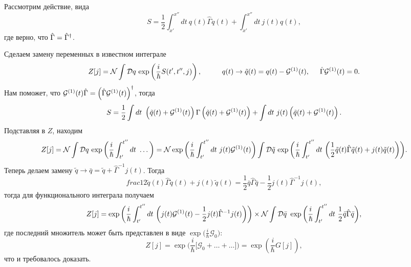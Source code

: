 
Рассмотрим действие, вида
\begin{equation*}
	S = \frac{1}{2} \int_{x'}^{x''} dt\ q(t) \hat{\Gamma} q(t) + 
	\int_{x'}^{x''}  dt\ j(t) q(t),
\end{equation*}
где верно, что $\hat{\Gamma} = \hat{\Gamma}^\dagger$. 


Сделаем замену переменных в известном интеграле
\begin{equation*}
	Z[j] = \n \int \Dq \exp\left(\frac{i}{\hbar} S(t', t'', j)\right),
	\hspace{10 mm} 
	q(t) \to \tilde{q}(t) = q(t) - \G (t),
	\hspace{5 mm} 
	\hat{\Gamma} \G (t) = 0.
\end{equation*}
Нам поможет, что $\mathcal{G}^{(1)}(t) \hat{\Gamma} = \left(\hat{\Gamma} \mathcal{G}^{(1)}(t)\right)^\dagger$, тогда
\begin{equation*}
	S = \frac{1}{2} \int dt\ \left(\tilde{q}(t) + \mathcal{G}^{(1)}(t)\right) \Gamma \left(\tilde{q}(t) + \mathcal{G}^{(1)} (t)\right) + \int dt\ j(t) \left(\tilde{q}(t) + \mathcal{G}^{(1)}(t)\right).
\end{equation*}
Подставляя в $Z$, находим
\begin{equation*}
	Z[j] = \mathcal{N} \int\mathcal{D}q\, \exp\bigg(
		\frac{i}{\hbar} \int_{t'}^{t''} dt\ \ldots
	\bigg) = \mathcal{N} \exp\bigg(
		\frac{i}{\hbar} \int_{t'}^{t''} dt\ j(t) \mathcal{G}^{(1)}(t)
	\bigg) \int \mathcal{D} \tilde{q}\, 
	\exp\bigg(
		\frac{i}{\hbar} \int_{t'}^{t''} dt\ \bigg(
			\frac{1}{2} \tilde{q}(t) \hat{\Gamma} \tilde{q}(t) + j(t) \tilde{q}(t)
		\bigg)
	\bigg).
\end{equation*}
Теперь делаем замену $\tilde{q} \to \bar{q} = \tilde{q} + \hat{\Gamma}^{-1} j(t)$.  Тогда
\begin{equation*}
	frac{1}{2} \tilde{q}(t) \hat{\Gamma} \tilde{q}(t) + j(t) \tilde{q}(t)  = 
	\frac{1}{2} \bar{q} \hat{\Gamma} \bar{q} - \frac{1}{2} j(t) \hat{\Gamma}^{-1} j(t),
\end{equation*}
тогда для функционального интеграла получаем
\begin{equation*}
	Z[j] = \exp\bigg(
		\frac{i}{\hbar} \int_{t'}^{t''} dt\ \bigg(
			j(t) \mathcal{G}^{(1)}(t) - \frac{1}{2} j(t) \hat{\Gamma}^{-1} j(t)
		\bigg)
	\bigg) \times  \mathcal{N} \int \mathcal{D} \bar{q}\ \exp\bigg(
		\frac{i}{\hbar} \int_{t'}^{t''} dt\ \frac{1}{2} \bar{q} \hat{\Gamma} \bar{q}
	\bigg),
\end{equation*}
где последний множитель может быть представлен в виде $\exp\bigg(\frac{i}{\hbar} \mathcal{G}_0\bigg)$:
\begin{equation*}
	Z[j] =  \exp\bigg(
		\frac{i}{\hbar} \bigg[
			\mathcal{G}_0  + \ldots + \ldots
		\bigg]
	\bigg) = \exp\left(\frac{i}{\hbar} G[j]\right),
\end{equation*}
что и требовалось доказать. 